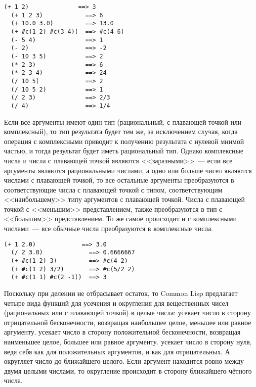 \begin{lstlisting}[style=lisprepl]
  (+ 1 2)              ==> 3
  (+ 1 2 3)            ==> 6
  (+ 10.0 3.0)         ==> 13.0
  (+ #c(1 2) #c(3 4))  ==> #c(4 6)
  (- 5 4)              ==> 1
  (- 2)                ==> -2
  (- 10 3 5)           ==> 2
  (* 2 3)              ==> 6
  (* 2 3 4)            ==> 24
  (/ 10 5)             ==> 2
  (/ 10 5 2)           ==> 1
  (/ 2 3)              ==> 2/3
  (/ 4)                ==> 1/4
\end{lstlisting}

Если все аргументы имеют один тип (рациональный, с плавающей точкой или комплексный), то
тип результата будет тем же, за исключением случая, когда операция с комплексными приводит
к получению результата с нулевой мнимой частью, и тогда результат будет иметь рациональный
тип.  Однако комплексные числа и числа с плавающей точкой являются <<заразными>>~--- если все
аргументы являются рациональными числами, а одно или больше чисел являются числами с
плавающей точкой, то все остальные аргументы преобразуются в соответствующие числа с
плавающей точкой с типом, соответствующим <<наибольшему>> типу аргументов с плавающей
точкой.  Числа с плавающей точкой с <<меньшим>> представлением, также преобразуются в тип с
<<большим>> представлением.  То же самое происходит и с комплексными числами~--- все обычные
числа преобразуются в комплексные числа.

\begin{lstlisting}[style=lisprepl]
  (+ 1 2.0)             ==> 3.0
  (/ 2 3.0)             ==> 0.6666667
  (+ #c(1 2) 3)         ==> #c(4 2)
  (+ #c(1 2) 3/2)       ==> #c(5/2 2)
  (+ #c(1 1) #c(2 -1))  ==> 3
\end{lstlisting}

Поскольку \code{/} при делении не отбрасывает остаток, то Common Lisp предлагает четыре
вида функций для усечения и округления для вещественных чисел (рациональных или с
плавающей точкой) в целые числа:  усекает число в сторону отрицательной
бесконечности, возвращая наибольшее целое, меньшее или равное аргументу. 
усекает число в сторону положительной бесконечности, возвращая наименьшее целое, большее
или равное аргументу.  усекает число в сторону нуля, ведя себя как
 для положительных аргументов, и как  для отрицательных.  А
 округляет число до ближайшего целого. Если аргумент находится ровно между
двумя целыми числами, то округление происходит в сторону ближайшего чётного числа.

